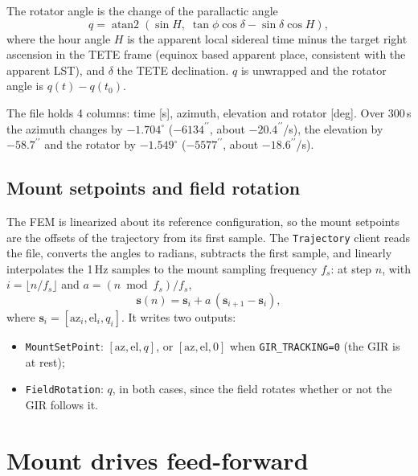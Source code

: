 \documentclass{gmto}
\numberwithin{table}{section}
\numberwithin{equation}{section}
\newcommand{\code}[1]{\texttt{#1}}
\newcommand{\arcsec}{^{\prime\prime}}
\newcommand{\vect}[1]{\boldsymbol{#1}}
\begin{document}
The rotator angle is the change of the parallactic angle
\begin{equation}
  q = \operatorname{atan2}\!\left(\sin H,\; \tan\phi\cos\delta - \sin\delta\cos H\right),
  \label{eq:parallactic}
\end{equation}
where the hour angle $H$ is the apparent local sidereal time minus the target right ascension
in the TETE frame (equinox based apparent place, consistent with the apparent LST), and
$\delta$ the TETE declination. $q$ is unwrapped and the rotator angle is $q(t) - q(t_0)$.

The file holds 4 columns: time [s], azimuth, elevation and rotator [deg].
Over 300\,s the azimuth changes by $-1.704^\circ$ ($-6134\arcsec$, about $-20.4\arcsec$/s),
the elevation by $-58.7\arcsec$ and the rotator by $-1.549^\circ$ ($-5577\arcsec$, about
$-18.6\arcsec$/s).

\subsection{Mount setpoints and field rotation}
\label{sec:setpoints}

The FEM is linearized about its reference configuration, so the mount setpoints are the
offsets of the trajectory from its first sample. The \code{Trajectory} client reads the file,
converts the angles to radians, subtracts the first sample, and linearly interpolates the 1\,Hz
samples to the mount sampling frequency $f_s$: at step $n$, with $i = \lfloor n/f_s\rfloor$ and
$a = (n \bmod f_s)/f_s$,
\begin{equation}
  \vect{s}(n) = \vect{s}_i + a\,(\vect{s}_{i+1} - \vect{s}_i),
\end{equation}
where $\vect{s}_i = [\mathrm{az}_i, \mathrm{el}_i, q_i]$.
It writes two outputs:
\begin{itemize}
\item \code{MountSetPoint}: $[\mathrm{az}, \mathrm{el}, q]$, or $[\mathrm{az}, \mathrm{el}, 0]$
  when \code{GIR\_TRACKING=0} (the GIR is at rest);
\item \code{FieldRotation}: $q$, in both cases, since the field rotates whether or not the GIR
  follows it.
\end{itemize}

\section{Mount drives feed-forward}
\label{sec:feedforward}
\end{document}
